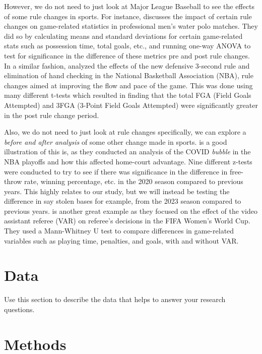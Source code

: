 \documentclass[12pt]{article}
\begin{document}
However, we do not need to just look at Major League Baseball to see
the effects of some rule changes in sports. For instance, \citet{Madera}
discusses the impact of certain rule changes on game-related statistics in
professional men's water polo matches. They did so by calculating means and
standard deviations for certain game-related stats such as possession time,
total goals, etc., and running one-way ANOVA to test for significance in the
difference of these metrics pre and post rule changes. In a similar fashion,
\citet{Nourayi} analyzed the effects of the new defensive 3-second rule and
elimination of hand checking in the National Basketball Association (NBA), rule
changes aimed at improving the flow and pace of the game. This was done using
many different t-tests which resulted in finding that the total FGA (Field Goals
Attempted) and 3FGA (3-Point Field Goals Attempted) were significantly greater
in the post rule change period.

Also, we do not need to just look at rule changes specifically, we can explore
a \emph{before and after analysis} of some other change made in sports. \citet{Price}
is a good illustration of this is, as they conducted an analysis of the COVID
\emph{bubble} in the NBA playoffs and how this affected home-court advantage.
Nine different z-tests were conducted to try to see if there was significance in
the difference in free-throw rate, winning percentage, etc. in the 2020 season
compared to previous years. This highly relates to our study, but we will instead
be testing the difference in say stolen bases for example, from the 2023 season
compared to previous years. \citet{Zhang} is another great example as they
focused on the effect of the video assistant referee (VAR) on referee's decisions
in the FIFA Women's World Cup. They used a Mann-Whitney U test to compare differences
in game-related variables such as playing time, penalties, and goals, with and
without VAR.


\section{Data}
\label{sec:data}

Use this section to describe the data that helps to answer your research
questions.

\section{Methods}
\label{sec:meth}
\end{document}
